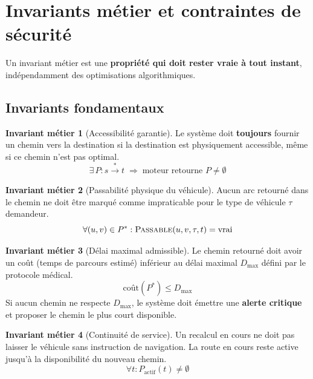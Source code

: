 \documentclass[12pt,a4paper]{article}
\theoremstyle{definition}
\newtheorem{invariant}{Invariant métier}[section]
\theoremstyle{remark}
\begin{document}
\newpage

\section{Invariants métier et contraintes de sécurité}

Un invariant métier est une \textbf{propriété qui doit rester vraie à tout
instant}, indépendamment des optimisations algorithmiques.

\subsection{Invariants fondamentaux}

\begin{invariant}[Accessibilité garantie]
  Le système doit \textbf{toujours} fournir un chemin vers la destination
  si la destination est physiquement accessible, même si ce chemin n'est
  pas optimal.
  $$
  \exists\, P : s \xrightarrow{*} t \;\Rightarrow\; \text{moteur retourne } P \neq \emptyset
  $$
\end{invariant}

\begin{invariant}[Passabilité physique du véhicule]
  Aucun arc retourné dans le chemin ne doit être marqué comme impraticable
  pour le type de véhicule $\tau$ demandeur.
  $$
  \forall (u,v) \in P^* : \textsc{Passable}(u,v,\tau,t) = \text{vrai}
  $$
\end{invariant}

\begin{invariant}[Délai maximal admissible]
  Le chemin retourné doit avoir un coût (temps de parcours estimé)
  inférieur au délai maximal $D_{\max}$ défini par le protocole médical.
  $$
  \text{coût}(P^*) \leq D_{\max}
  $$
  Si aucun chemin ne respecte $D_{\max}$, le système doit émettre une
  \textbf{alerte critique} et proposer le chemin le plus court disponible.
\end{invariant}

\begin{invariant}[Continuité de service]
  Un recalcul en cours ne doit pas laisser le véhicule sans instruction
  de navigation. La route en cours reste active jusqu'à la disponibilité
  du nouveau chemin.
  $$
  \forall t : P_{\text{actif}}(t) \neq \emptyset
  $$
\end{invariant}
\end{document}
